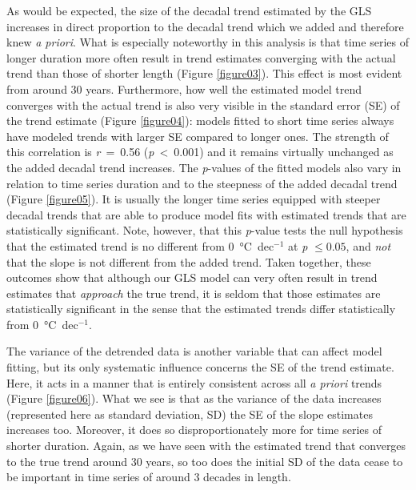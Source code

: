 \documentclass[]{ametsoc}
\begin{document}
As would be expected, the size of the decadal trend estimated by the GLS increases in direct proportion to the decadal trend which we added and therefore knew \emph{a priori}. What is especially noteworthy in this analysis is that time series of longer duration more often result in trend estimates converging with the actual trend than those of shorter length (Figure \ref{figure03}). This effect is most evident from around 30 years. Furthermore, how well the estimated model trend converges with the actual trend is also very visible in the standard error (SE) of the trend estimate (Figure \ref{figure04}): models fitted to short time series always have modeled trends with larger SE compared to longer ones. The strength of this correlation is \emph{r}~=~0.56 (\emph{p}~\textless~0.001) and it remains virtually unchanged as the added decadal trend increases. The \emph{p}-values of the fitted models also vary in relation to time series duration and to the steepness of the added decadal trend (Figure \ref{figure05}). It is usually the longer time series equipped with steeper decadal trends that are able to produce model fits with estimated trends that are statistically significant. Note, however, that this \emph{p}-value tests the null hypothesis that the estimated trend is no different from \SI{0}{\degreeCelsius}~dec$^{-1}$ at \emph{p} $\leq 0.05$, and \emph{not} that the slope is not different from the added trend. Taken together, these outcomes show that although our GLS model can very often result in trend estimates that \emph{approach} the true trend, it is seldom that those estimates are statistically significant in the sense that the estimated trends differ statistically from \SI{0}{\degreeCelsius}~dec$^{-1}$.

The variance of the detrended data is another variable that can affect model fitting, but its only systematic influence concerns the SE of the trend estimate. Here, it acts in a manner that is entirely consistent across all \emph{a priori} trends (Figure \ref{figure06}). What we see is that as the variance of the data increases (represented here as standard deviation, SD) the SE of the slope estimates increases too. Moreover, it does so disproportionately more for time series of shorter duration. Again, as we have seen with the estimated trend that converges to the true trend around 30 years, so too does the initial SD of the data cease to be important in time series of around 3 decades in length.
\end{document}
